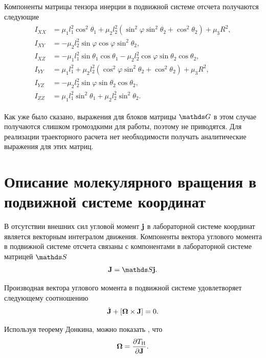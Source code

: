 Компоненты матрицы тензора инерции в подвижной системе отсчета получаются следующие
\begin{gather}
    \begin{aligned}
        I_{XX} &= \mu_1 l_1^2 \cos^2 \theta_1 + \mu_2 l_2^2 (\sin^2 \varphi \sin^2 \theta_2 + \cos^2 \theta_2) + \mu_3 R^2, \\ 
        I_{XY} &= -\mu_2 l_2^2 \sin \varphi \cos \varphi \sin^2 \theta_2, \\ 
        I_{XZ} &= -\mu_1 l_1^2 \sin \theta_1 \cos \theta_1 - \mu_2 l_2^2 \cos \varphi \sin \theta_2 \cos \theta_2, \\
        I_{YY} &= \mu_1 l_1^2 + \mu_2 l_2^2 (\cos^2 \varphi \sin^2 \theta_2 + \cos^2 \theta_2) + \mu_3 R^2, \\
        I_{YZ} &= -\mu_2 l_2^2 \sin \varphi \sin \theta_2 \cos \theta_2, \\
        I_{ZZ} &= \mu_1 l_1^2 \sin^2 \theta_1 + \mu_2 l_2^2 \sin^2 \theta_2.  
    \end{aligned} 
\end{gather}

Как уже было сказано, выражения для блоков матрицы $\bbG$ в этом случае получаются слишком громоздкими для работы, поэтому не приводятся. Для реализации траекторного расчета нет необходимости получать аналитические выражения для этих матриц. 

\section{Описание молекулярного вращения в подвижной системе координат} \label{section:rotational-dynamics}

В отсутствии внешних сил угловой момент $\mathbf{j}$ в лабораторной системе координат является векторным интегралом движения. Компоненты вектора углового момента в подвижной системе отсчета связаны с компонентами в лабораторной системе матрицей $\bbS$
\begin{gather}
    \mf{J} = \bbS \mf{j}. \label{polyatom-j-connection}
\end{gather}

Производная вектора углового момента в подвижной системе удовлетворяет следующему соотношению \cite{goldstein}
\begin{gather}
    \dot{\mathbf{J}} + \left[ \boldsymbol{\Omega} \times \mathbf{J} \right] = 0.
\end{gather}

Используя теорему Донкина, можно показать \cite{petrov2015}, что 
\begin{gather}
    \boldsymbol{\Omega} = \frac{\partial T_\text{H}}{\partial \mathbf{J}}. 
\end{gather}

